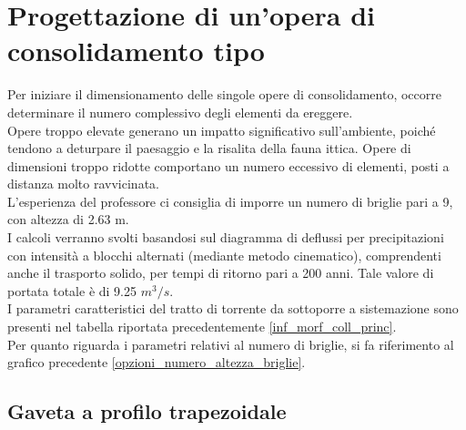 \section{Progettazione di un'opera di consolidamento tipo}
Per iniziare il dimensionamento delle singole opere di consolidamento, occorre determinare il numero complessivo degli elementi da ereggere.\\
Opere troppo elevate generano un impatto significativo sull'ambiente, poiché tendono a deturpare il paesaggio e la risalita della fauna ittica. Opere di dimensioni troppo ridotte comportano un numero eccessivo di elementi, posti a distanza molto ravvicinata.\\
L'esperienza del professore ci consiglia di imporre un numero di briglie pari a 9, con altezza di 2.63 m.\\
I calcoli verranno svolti basandosi sul diagramma di deflussi per precipitazioni con intensità a blocchi alternati (mediante metodo cinematico), comprendenti anche il trasporto solido, per tempi di ritorno pari a 200 anni. Tale valore di portata totale è di 9.25 $m^3/s$.\\
I parametri caratteristici del tratto di torrente da sottoporre a sistemazione sono presenti nel tabella riportata precedentemente \ref{inf_morf_coll_princ}.\\
Per quanto riguarda i parametri relativi al numero di briglie, si fa riferimento al grafico precedente \ref{opzioni_numero_altezza_briglie}.
\subsection{Gaveta a profilo trapezoidale}
